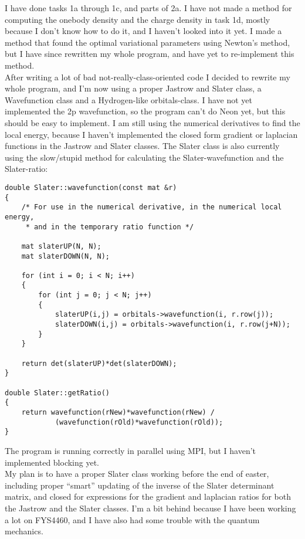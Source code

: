 I have done tasks 1a through 1c, and parts of 2a. I have not made a method for computing the onebody density and the charge density in task 1d, mostly because I don't know how to do it, and I haven't looked into it yet. I made a method that found the optimal variational parameters using Newton's method, but I have since rewritten my whole program, and have yet to re-implement this method. \\

After writing a lot of bad not-really-class-oriented code I decided to rewrite my whole program, and I'm now using a proper Jastrow and Slater class, a Wavefunction class and a Hydrogen-like orbitals-class. I have not yet implemented the 2p wavefunction, so the program can't do Neon yet, but this should be easy to implement. I am still using the numerical derivatives to find the local energy, because I haven't implemented the closed form gradient or laplacian functions in the Jastrow and Slater classes. The Slater class is also currently using the slow/stupid method for calculating the Slater-wavefunction and the Slater-ratio:
\begin{lstlisting}
double Slater::wavefunction(const mat &r)
{
    /* For use in the numerical derivative, in the numerical local energy,
     * and in the temporary ratio function */

    mat slaterUP(N, N);
    mat slaterDOWN(N, N);

    for (int i = 0; i < N; i++)
    {
        for (int j = 0; j < N; j++)
        {
            slaterUP(i,j) = orbitals->wavefunction(i, r.row(j));
            slaterDOWN(i,j) = orbitals->wavefunction(i, r.row(j+N));
        }
    }

    return det(slaterUP)*det(slaterDOWN);
}

double Slater::getRatio()
{
    return wavefunction(rNew)*wavefunction(rNew) /
            (wavefunction(rOld)*wavefunction(rOld));
}
\end{lstlisting}

The program is running correctly in parallel using MPI, but I haven't implemented blocking yet. \\

My plan is to have a proper Slater class working before the end of easter, including proper ``smart'' updating of the inverse of the Slater determinant matrix, and closed for expressions for the gradient and laplacian ratios for both the Jastrow and the Slater classes. I'm a bit behind because I have been working a lot on FYS4460, and I have also had some trouble with the quantum mechanics.